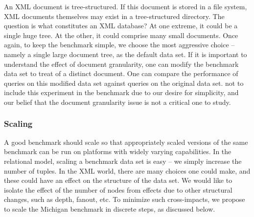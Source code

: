 An XML document is tree-structured.  If this document is stored in a
file system, XML documents themselves may exist in a tree-structured
directory. The question is what constitutes an XML database?  At one
extreme, it could be a single huge tree.  At the other, it could
comprise many small documents.   Once again, to keep the benchmark simple, we choose the most
aggressive choice -- namely a single large document tree, as the
default data set.  If it is important to understand the effect of
document granularity, one can modify the benchmark data set to treat
  
of a distinct document.  One can
compare the performance of queries on this modified data set against
queries on the original data set.    not to include this
experiment in the benchmark due to our desire for simplicity, and our
belief that the document granularity issue is not a critical one to
study.


\subsubsection{Scaling}
A good benchmark should scale so that appropriately scaled versions of
the same benchmark can be run on platforms with widely varying
capabilities.  In the relational model, scaling a benchmark data set
is easy -- we simply increase the number of tuples.  In the XML world,
there are many choices one could make, and these could have an effect
on the structure of the data set.  We would like to isolate the effect
of the number of nodes from effects due to other structural changes,
such as depth, fanout, etc.  To minimize such cross-impacts, we
propose to scale the Michigan benchmark in discrete steps, as
discussed below.

